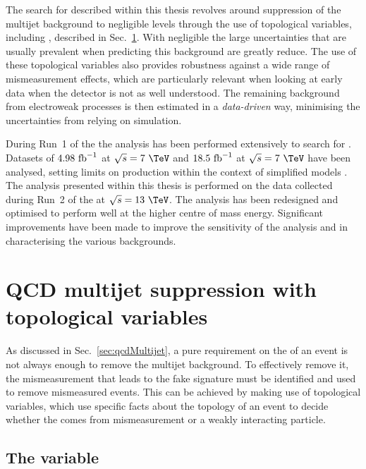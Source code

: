 The search for \SUSY described within this thesis revolves around
suppression of the \QCD multijet background to negligible levels
through the use of topological variables, including \alphat,
described in Sec.~\ref{sec:topoVars}. With negligible \QCD the
large uncertainties that are usually prevalent when predicting this
background are greatly reduce. The use of these topological variables
also provides robustness against a wide range of mismeasurement
effects, which are particularly relevant when looking at early data
when the detector is not as well understood. The remaining background
from electroweak processes is then estimated in a \emph{data-driven} way,
minimising the uncertainties from relying on simulation.

During Run~1 of the \LHC the \alphat analysis has been performed
extensively to search for \SUSY. Datasets of $4.98~\text{fb}^{-1}$ at
$\sqrt{s}=7~\tev$ and $18.5~\text{fb}^{-1}$ at $\sqrt{s}=7~\tev$ have been
analysed, setting limits on \SUSY production within the context of
simplified models
\cite{Chatrchyan:2011zy,Khachatryan:2011tk,Chatrchyan:2012wa,Chatrchyan:2013mys,Khachatryan:2016pxa}.
The analysis presented within this thesis is performed on the data
collected during Run~2 of the \LHC at $\sqrt{s}=13~\tev$. The analysis
has been redesigned and optimised to perform well at the higher centre
of mass energy. Significant improvements have been made to improve the
sensitivity of the analysis and in characterising the various
backgrounds.

\section{QCD multijet suppression with topological variables} %
\label{sec:topoVars}

As discussed in Sec.~\ref{sec:qcdMultijet}, a pure requirement on the
\MET of an event is not always enough to remove the \QCD multijet
background.  To effectively remove it, the mismeasurement that leads
to the fake \MET signature must be identified and used to remove
mismeasured events. This can be achieved by making use of topological
variables, which use specific facts about the topology of an event to
decide whether the \MET comes from mismeasurement or a weakly
interacting particle. 

\subsection{The \alphat variable}

